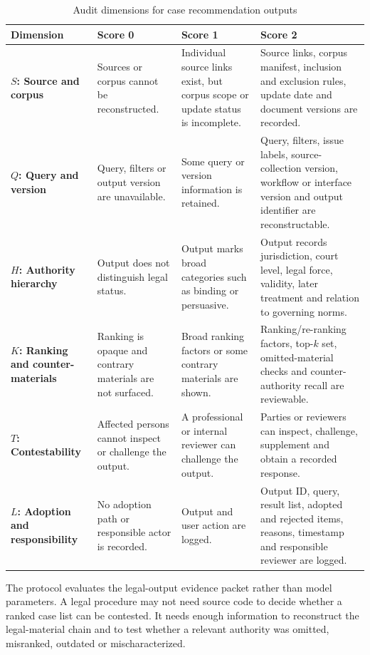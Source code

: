 \documentclass[12pt,a4paper]{article}
\begin{document}
\begin{table}[htbp]
\centering
\caption{Audit dimensions for case recommendation outputs}
\label{tab:audit-dimensions}
\renewcommand{\arraystretch}{1.15}
\begin{tabularx}{\textwidth}{>{\bfseries}p{2.5cm}p{2.3cm}YY}
\toprule
Dimension & Score 0 & Score 1 & Score 2 \\
\midrule
$S$: Source and corpus & Sources or corpus cannot be reconstructed. & Individual source links exist, but corpus scope or update status is incomplete. & Source links, corpus manifest, inclusion and exclusion rules, update date and document versions are recorded. \\
$Q$: Query and version & Query, filters or output version are unavailable. & Some query or version information is retained. & Query, filters, issue labels, source-collection version, workflow or interface version and output identifier are reconstructable. \\
$H$: Authority hierarchy & Output does not distinguish legal status. & Output marks broad categories such as binding or persuasive. & Output records jurisdiction, court level, legal force, validity, later treatment and relation to governing norms. \\
$K$: Ranking and counter-materials & Ranking is opaque and contrary materials are not surfaced. & Broad ranking factors or some contrary materials are shown. & Ranking/re-ranking factors, top-$k$ set, omitted-material checks and counter-authority recall are reviewable. \\
$T$: Contestability & Affected persons cannot inspect or challenge the output. & A professional or internal reviewer can challenge the output. & Parties or reviewers can inspect, challenge, supplement and obtain a recorded response. \\
$L$: Adoption and responsibility & No adoption path or responsible actor is recorded. & Output and user action are logged. & Output ID, query, result list, adopted and rejected items, reasons, timestamp and responsible reviewer are logged. \\
\bottomrule
\end{tabularx}
\end{table}

The protocol evaluates the legal-output evidence packet rather than model parameters. A legal procedure may not need source code to decide whether a ranked case list can be contested. It needs enough information to reconstruct the legal-material chain and to test whether a relevant authority was omitted, misranked, outdated or mischaracterized.
\end{document}
